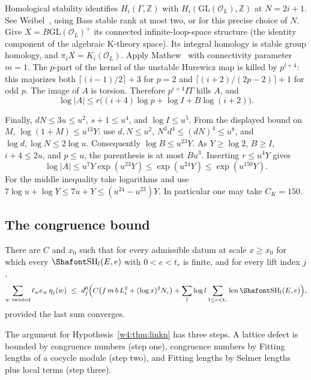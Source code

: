 Homological stability identifies $H_i(\Gamma,\mathbb Z)$ with $H_i(\mathrm{GL}(\mathcal O_L),\mathbb Z)$ at $N=2i+1$. See Weibel~\cite[IV.1.14.1]{weibelBook}, using Bass stable rank at most two, or \cite[\S3.1]{badCells} for this precise choice of $N$. Give $X=B\mathrm{GL}(\mathcal O_L)^+$ its connected infinite-loop-space structure (the identity component of the algebraic K-theory space). Its integral homology is stable group homology, and $\pi_iX=K_i(\mathcal O_L)$. Apply Mathew~\cite[Thm.~6.3]{badMathew} with connectivity parameter $m=1$. The $p$-part of the kernel of the unstable Hurewicz map is killed by $p^{i+4}$: this majorizes both $\lceil(i-1)/2\rceil+3$ for $p=2$ and $\lceil(i+2)/(2p-2)\rceil+1$ for odd $p$. The image of $A$ is torsion. Therefore $p^{i+4}IT$ kills $A$, and
\[\log |A|\le r\big((i+4)\log p+\log I+B\log(i+2)\big).\]

Finally, $dN\le3u\le u^2$, $s+1\le u^4$, and $\log I\le u^5$. From the displayed bound on $M$, $\log(1+M)\le u^{13}Y$: use $d,N\le u^2$, $N^3d^4\le(dN)^4\le u^8$, and $\log d,\log N\le2\log u$. Consequently $\log B\le u^{23}Y$. As $Y\ge\log2$, $B\ge I$, $i+4\le 2u$, and $p\le u$, the parenthesis is at most $B u^3$. Inserting $r\le u^4Y$ gives
\[\log |A|\le u^7Y\exp(u^{23}Y)\le\exp(u^{24}Y)\le\exp(u^{150}Y).\]
For the middle inequality take logarithms and use $7\log u+\log Y\le 7u+Y\le (u^{24}-u^{23})Y$. In particular one may take $C_K=150$.


\subsection{The congruence bound}\label{tw:sec:linkn}

\begin{hypothesis}\label{w4:thm:linkn}
There are $C$ and $x_0$ such that for every admissible datum at scale $x\ge x_0$ for which every $\Sha_l(E,e)$ with $0<e<t_r$ is finite, and for every lift index $j$,
\[
\sum_{w\ \mathrm{twisted}}\ell_we_w\,\eta_j(w)\ \le\ d^0_j\Bigl(C\bigl(f\,m\,b\,L_\varepsilon^2+(\log x)^2N_c\bigr)+\sum_l\log l\sum_{1\le e<t_r}\len\Sha_l(E,e)\Bigr),
\]
provided the last sum converges.
\end{hypothesis}

The argument for Hypothesis~\ref{w4:thm:linkn} has three steps. A lattice defect is bounded by congruence numbers (step one), congruence numbers by Fitting lengths of a cocycle module (step two), and Fitting lengths by Selmer lengths plus local terms (step three).

